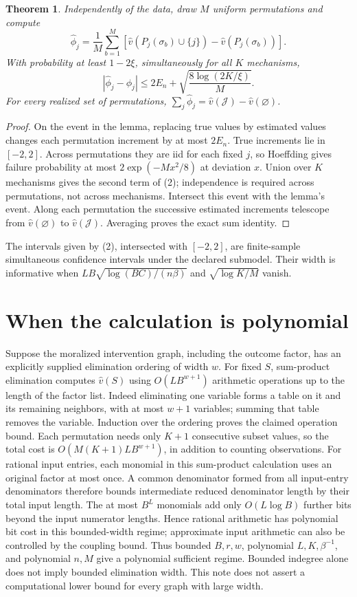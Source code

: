 \documentclass[11pt]{article}
\newtheorem{theorem}{Theorem}
\theoremstyle{definition}
\begin{document}
\begin{theorem}
Independently of the data, draw $M$ uniform permutations and compute
\[
 \widehat\phi_j=\frac1M\sum_{b=1}^M
 [\widehat v(P_j(\sigma_b)\cup\{j\})-\widehat v(P_j(\sigma_b))].
\]
With probability at least $1-2\xi$, simultaneously for all $K$ mechanisms,
\[
 |\widehat\phi_j-\phi_j|
 \le2E_n+\sqrt{\frac{8\log(2K/\xi)}{M}}.               \tag{2}
\]
For every realized set of permutations,
$\sum_j\widehat\phi_j=\widehat v(\mathcal J)-\widehat v(\varnothing)$.
\end{theorem}
\begin{proof}
On the event in the lemma, replacing true values by estimated values
changes each permutation increment by at most $2E_n$.
True increments lie in $[-2,2]$. Across permutations they are iid for
each fixed $j$, so Hoeffding gives failure probability at most
$2\exp(-Mx^2/8)$ at deviation $x$. Union over $K$ mechanisms gives
the second term of (2); independence is required across permutations,
not across mechanisms. Intersect this event with the lemma's event.
Along each permutation the successive estimated increments telescope
from $\widehat v(\varnothing)$ to $\widehat v(\mathcal J)$.
Averaging proves the exact sum identity.
\end{proof}
The intervals given by (2), intersected with $[-2,2]$, are finite-sample
simultaneous confidence intervals under the declared submodel. Their width
is informative when $L B\sqrt{\log(BC)/(n\beta)}$ and
$\sqrt{\log K/M}$ vanish.

\section*{When the calculation is polynomial}
Suppose the moralized intervention graph, including the outcome factor,
has an explicitly supplied elimination ordering of width $w$.
For fixed $S$, sum-product elimination computes $\widehat v(S)$ using
$O(L B^{w+1})$ arithmetic operations up to the length of the factor list.
Indeed eliminating one variable forms a table on it and its remaining
neighbors, with at most $w+1$ variables; summing that table removes the
variable. Induction over the ordering proves the claimed operation bound.
Each permutation needs only $K+1$ consecutive subset values, so the total
cost is $O(M(K+1)L B^{w+1})$, in addition to counting observations.
For rational input entries, each monomial in this sum-product calculation
uses an original factor at most once. A common denominator formed from all
input-entry denominators therefore bounds intermediate reduced denominator
length by their total input length. The at most $B^L$ monomials add only
$O(L\log B)$ further bits beyond the input numerator lengths. Hence
rational arithmetic has polynomial bit cost in this bounded-width regime;
approximate input arithmetic can also be controlled by the coupling bound.
Thus bounded $B,r,w$, polynomial $L,K,\beta^{-1}$, and polynomial $n,M$
give a polynomial sufficient regime. Bounded indegree alone does not imply
bounded elimination width. This note does not assert a computational lower
bound for every graph with large width.
\end{document}
